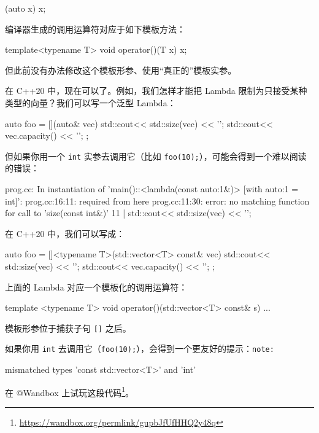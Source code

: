 \begin{codebox}
[](auto x) { x; }
\end{codebox}

编译器生成的调用运算符对应于如下模板方法：

\begin{codebox}
template<typename T>
void operator()(T x) { x; }
\end{codebox}

但此前没有办法修改这个模板形参、使用“真正的”模板实参。

在 C++20 中，现在可以了。例如，我们怎样才能把 Lambda 限制为只接受某种类型的向量？我们可以写一个泛型 Lambda：

\begin{codebox}
auto foo = [](auto& vec) {
std::cout<< std::size(vec) << '\n';
std::cout<< vec.capacity() << '\n';
};
\end{codebox}

但如果你用一个 \texttt{int} 实参去调用它（比如 \texttt{foo(10);}），可能会得到一个难以阅读的错误：

\begin{codebox}
prog.cc: In instantiation of
'main()::<lambda(const auto:1&)> [with auto:1 = int]':
prog.cc:16:11:
required from here
prog.cc:11:30: error: no matching function for call to 'size(const int&)'
11 | std::cout<< std::size(vec) << '\n';
\end{codebox}

在 C++20 中，我们可以写成：

\begin{codebox}
auto foo = []<typename T>(std::vector<T> const& vec) {
std::cout<< std::size(vec) << '\n';
std::cout<< vec.capacity() << '\n';
};
\end{codebox}

上面的 Lambda 对应一个模板化的调用运算符：

\begin{codebox}
template <typename T>
void operator()(std::vector<T> const& s) { ... }
\end{codebox}

模板形参位于捕获子句 \texttt{[]} 之后。

如果你用 \texttt{int} 去调用它（\texttt{foo(10);}），会得到一个更友好的提示：\texttt{note:}

\begin{codebox}
mismatched types 'const std::vector<T>' and 'int'
\end{codebox}

在 @Wandbox 上试玩这段代码\footnote{\url{https://wandbox.org/permlink/gupbJfUfHHQ2y48q}}。

